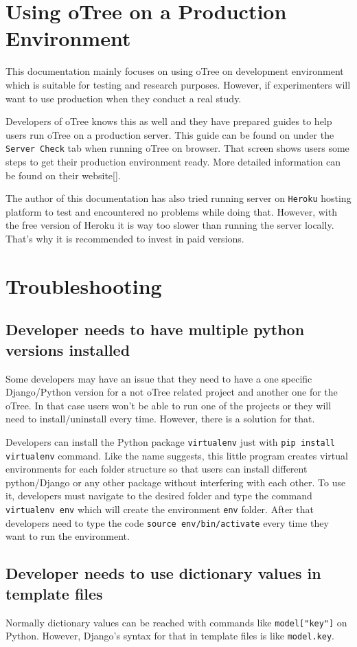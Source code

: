 \begin{appendix}
\section{Using oTree on a Production Environment}

This documentation mainly focuses on using oTree on development environment which is suitable for testing and research purposes. However, if experimenters will want to use production when they conduct a real study. 

Developers of oTree knows this as well and they have prepared guides to help users run oTree on a production server. This guide can be found on under the \verb|Server Check| tab when running oTree on browser. That screen shows users some steps to get their production environment ready. More detailed information can be found on their website[\cite{oTreeServer2017}].

The author of this documentation has also tried running server on \verb|Heroku| hosting platform to test and encountered no problems while doing that. However, with the free version of Heroku it is way too slower than running the server locally. That's why it is recommended to invest in paid versions.

\section{Troubleshooting}

\subsection{Developer needs to have multiple python versions installed}

Some developers may have an issue that they need to have a one specific Django/Python version for a not oTree related project and another one for the oTree. In that case users won't be able to run one of the projects or they will need to install/uninstall every time. However, there is a solution for that. 

Developers can install the Python package \verb|virtualenv| just with \verb|pip install virtualenv| command. Like the name suggests, this little program creates virtual environments for each folder structure so that users can install different python/Django or any other package without interfering with each other. To use it, developers must navigate to the desired folder and type the command \verb|virtualenv env| which will create the environment \verb|env| folder. After that developers need to type the code \verb|source env/bin/activate| every time they want to run the environment. 

\subsection{Developer needs to use dictionary values in template files}

Normally dictionary values can be reached with commands like \verb|model["key"]| on Python. However, Django's syntax for that in template files is like \verb|model.key|.


\end{appendix}

